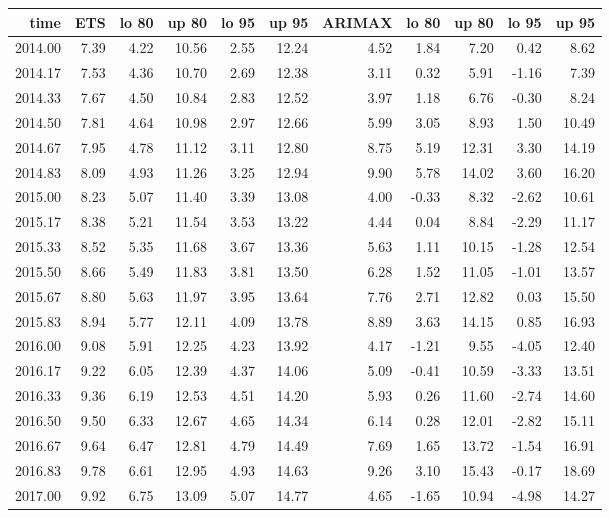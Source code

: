 \documentclass[10pt,a4paper]{article}\usepackage[]{graphicx}\usepackage[]{color}
\begin{document}
\begin{table}[ht]
\centering
\begin{tabular}{rrrrrrrrrrr}
  \hline
time & ETS  & lo 80 & up 80 & lo 95 & up 95 & ARIMAX  & lo 80 & up 80 & lo 95 & up 95 \\ 
  \hline
2014.00 & 7.39 & 4.22 & 10.56 & 2.55 & 12.24 & 4.52 & 1.84 & 7.20 & 0.42 & 8.62 \\ 
  2014.17 & 7.53 & 4.36 & 10.70 & 2.69 & 12.38 & 3.11 & 0.32 & 5.91 & -1.16 & 7.39 \\ 
  2014.33 & 7.67 & 4.50 & 10.84 & 2.83 & 12.52 & 3.97 & 1.18 & 6.76 & -0.30 & 8.24 \\ 
  2014.50 & 7.81 & 4.64 & 10.98 & 2.97 & 12.66 & 5.99 & 3.05 & 8.93 & 1.50 & 10.49 \\ 
  2014.67 & 7.95 & 4.78 & 11.12 & 3.11 & 12.80 & 8.75 & 5.19 & 12.31 & 3.30 & 14.19 \\ 
  2014.83 & 8.09 & 4.93 & 11.26 & 3.25 & 12.94 & 9.90 & 5.78 & 14.02 & 3.60 & 16.20 \\ 
  2015.00 & 8.23 & 5.07 & 11.40 & 3.39 & 13.08 & 4.00 & -0.33 & 8.32 & -2.62 & 10.61 \\ 
  2015.17 & 8.38 & 5.21 & 11.54 & 3.53 & 13.22 & 4.44 & 0.04 & 8.84 & -2.29 & 11.17 \\ 
  2015.33 & 8.52 & 5.35 & 11.68 & 3.67 & 13.36 & 5.63 & 1.11 & 10.15 & -1.28 & 12.54 \\ 
  2015.50 & 8.66 & 5.49 & 11.83 & 3.81 & 13.50 & 6.28 & 1.52 & 11.05 & -1.01 & 13.57 \\ 
  2015.67 & 8.80 & 5.63 & 11.97 & 3.95 & 13.64 & 7.76 & 2.71 & 12.82 & 0.03 & 15.50 \\ 
  2015.83 & 8.94 & 5.77 & 12.11 & 4.09 & 13.78 & 8.89 & 3.63 & 14.15 & 0.85 & 16.93 \\ 
  2016.00 & 9.08 & 5.91 & 12.25 & 4.23 & 13.92 & 4.17 & -1.21 & 9.55 & -4.05 & 12.40 \\ 
  2016.17 & 9.22 & 6.05 & 12.39 & 4.37 & 14.06 & 5.09 & -0.41 & 10.59 & -3.33 & 13.51 \\ 
  2016.33 & 9.36 & 6.19 & 12.53 & 4.51 & 14.20 & 5.93 & 0.26 & 11.60 & -2.74 & 14.60 \\ 
  2016.50 & 9.50 & 6.33 & 12.67 & 4.65 & 14.34 & 6.14 & 0.28 & 12.01 & -2.82 & 15.11 \\ 
  2016.67 & 9.64 & 6.47 & 12.81 & 4.79 & 14.49 & 7.69 & 1.65 & 13.72 & -1.54 & 16.91 \\ 
  2016.83 & 9.78 & 6.61 & 12.95 & 4.93 & 14.63 & 9.26 & 3.10 & 15.43 & -0.17 & 18.69 \\ 
  2017.00 & 9.92 & 6.75 & 13.09 & 5.07 & 14.77 & 4.65 & -1.65 & 10.94 & -4.98 & 14.27 \\ 

\end{tabular}
\end{table}
\end{document}
